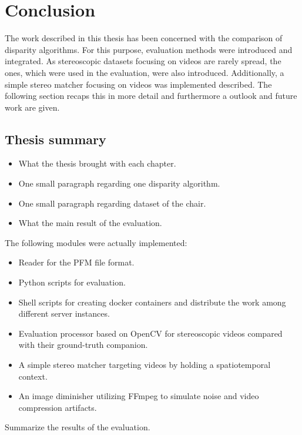 \chapter{Conclusion}
\label{chap:conclusion}

The work described in this thesis has been concerned with the comparison of disparity algorithms.
For this purpose, evaluation methods were introduced and integrated.
As stereoscopic datasets focusing on videos are rarely spread, the ones, which were used in the evaluation, were also introduced.
Additionally, a simple stereo matcher focusing on videos was implemented described.
The following section recaps this in more detail and furthermore a outlook and future work are given.

\section{Thesis summary}

\begin{itemize}
  \item What the thesis brought with each chapter.
  \item One small paragraph regarding one disparity algorithm.
  \item One small paragraph regarding dataset of the chair.
  \item What the main result of the evaluation.
\end{itemize}

\noindent The following modules were actually implemented:

\begin{itemize}
  \item Reader for the PFM file format.
  \item Python scripts for evaluation.
  \item Shell scripts for creating docker containers and distribute the work among different server instances.
  \item Evaluation processor based on OpenCV for stereoscopic videos compared with their ground-truth companion.
  \item A simple stereo matcher targeting videos by holding a spatiotemporal context.
  \item An image diminisher utilizing FFmpeg to simulate noise and video compression artifacts.
\end{itemize}

\noindent Summarize the results of the evaluation.


